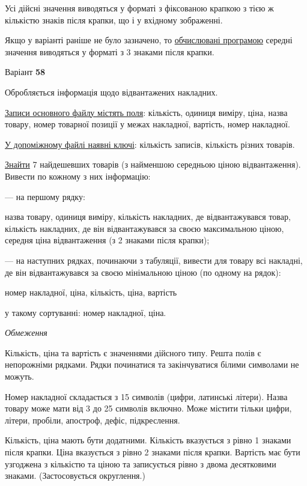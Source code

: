 \documentclass[11pt, ukrainian]{article}
\begin{document}
Усі дійсні значення виводяться у форматі з фіксованою крапкою з тією ж кількістю знаків після крапки, що і у вхідному зображенні.

Якщо у варіанті раніше не було зазначено, то \underline{обчислювані програмою} середні значення виводяться у форматі з 3 знаками після крапки.




\par
\newpage
{\center Варіант  \No \textbf { 58 }\par}
\bigskip
Обробляється інформація щодо відвантажених накладних.

\underline{Записи основного файлу містять поля}: кількість, одиниця виміру, ціна, назва товару, номер товарної позиції у межах накладної, вартість, номер накладної.

\underline{У допоміжному файлі наявні ключі}: кількість записів, кількість різних товарів.

\underline{Знайти} 7 найдешевших товарів (з найменшою середньою ціною відвантаження). Вивести по кожному з них інформацію:\par
{\noindent}--- на першому рядку:\par
назва товару, одиниця виміру, кількість накладних, де відвантажувався товар, кількість накладних, де він відвантажувався за своєю максимальною ціною, середня ціна відвантаження (з 2 знаками після крапки);

{\noindent}--- на наступних рядках, починаючи з табуляції, вивести для товару всі накладні, де він відвантажувався за своєю мінімальною ціною (по одному на рядок):\par
номер накладної, ціна, кількість, ціна, вартість

{\noindent}у такому сортуванні: номер накладної, ціна.


\bigskip\textit{Обмеження}

Кількість, ціна та вартість є значеннями дійсного типу.
Решта полів є непорожніми рядками.
Рядки починатися та закінчуватися білими символами не можуть.

Номер накладної складається з 15 символів (цифри, латинські літери).
Назва товару може мати від 3 до 25 символів включно.
Може містити тільки цифри, літери, пробіли, апостроф, дефіс, підкреслення.

Кількість, ціна мають бути додатними.
Кількість вказується з рівно 1 знаками після крапки.
Ціна вказується з рівно 2 знаками після крапки.
Вартість має бути узгоджена з кількістю та ціною та записується рівно з двома десятковими знаками.
(Застосовується округлення.)
\end{document}
